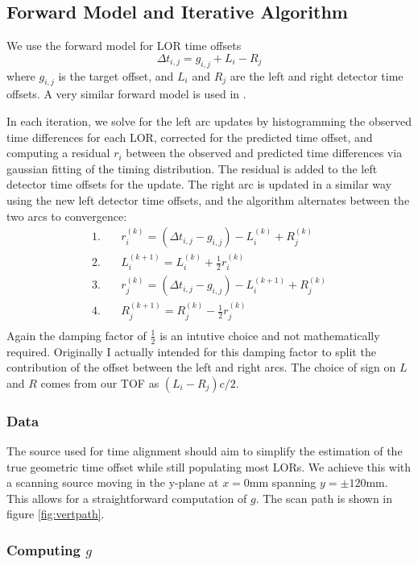 \documentclass{article}
\begin{document}
\subsection{Forward Model and Iterative Algorithm}
We use the forward model for LOR time offsets
\[\Delta t_{i, j} = g_{i, j} + L_i - R_j\]
where $g_{i, j}$ is the target offset, and $L_i$ and $R_j$ are the left and right detector time offsets. A very similar forward model is used in \cite{timingoffset}.

In each iteration, we solve for the left arc updates by histogramming the observed time differences for each LOR, corrected for the predicted time offset, and computing a residual $r_i$ between the observed and predicted time differences via gaussian fitting of the timing distribution. The residual is added to the left detector time offsets for the update. The right arc is updated in a similar way using the new left detector time offsets, and the algorithm alternates between the two arcs to convergence:
\begin{align*}
    1.\quad& r_i^{(k)} = (\Delta t_{i, j} - g_{i, j}) - L_i^{(k)} + R_j^{(k)} \\
    2.\quad& L_{i}^{(k+1)} = L_{i}^{(k)} + \frac12r_i^{(k)} \\
    3.\quad& r_j^{(k)} = (\Delta t_{i, j} - g_{i, j}) - L_i^{(k+1)} + R_j^{(k)} \\
    4.\quad& R_{j}^{(k+1)} = R_{j}^{(k)} - \frac12r_j^{(k)} \\
\end{align*}
Again the damping factor of $\frac12$ is an intutive choice and not mathematically required. Originally I actually intended for this damping factor to split the contribution of the offset between the left and right arcs. The choice of sign on $L$ and $R$ comes from our TOF as $(L_i - R_j)c/ 2$.

\subsubsection{Data}
The source used for time alignment should aim to simplify the estimation of the true geometric time offset while still populating most LORs. We achieve this with a scanning source moving in the y-plane at $x=0\text{mm}$ spanning $y=\pm120\text{mm}$. This allows for a straightforward computation of $g$. The scan path is shown in figure \ref{fig:vertpath}.


\subsubsection{Computing $g$}
\end{document}

